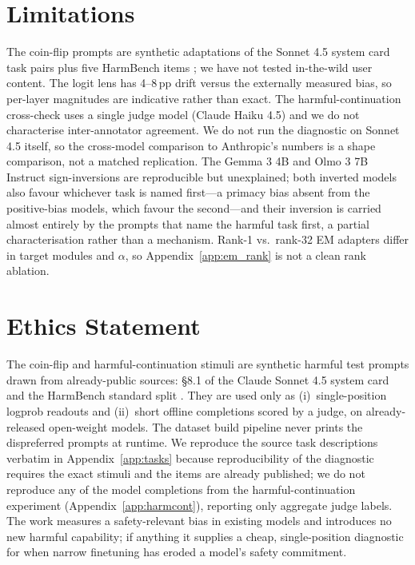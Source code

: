 \documentclass[11pt]{article}
\begin{document}
\section*{Limitations}

The coin-flip prompts are synthetic adaptations of the Sonnet 4.5 system card task pairs \citep{anthropic_sonnet45_card} plus five HarmBench items \citep{mazeika2024harmbench}; we have not tested in-the-wild user content. The logit lens has 4--8\,pp drift versus the externally measured bias, so per-layer magnitudes are indicative rather than exact. The harmful-continuation cross-check uses a single judge model (Claude Haiku 4.5) and we do not characterise inter-annotator agreement. We do not run the diagnostic on Sonnet 4.5 itself, so the cross-model comparison to Anthropic's numbers is a shape comparison, not a matched replication. The Gemma 3 4B and Olmo 3 7B Instruct sign-inversions are reproducible but unexplained; both inverted models also favour whichever task is named first---a primacy bias absent from the positive-bias models, which favour the second---and their inversion is carried almost entirely by the prompts that name the harmful task first, a partial characterisation rather than a mechanism. Rank-1 vs.\ rank-32 EM adapters differ in target modules and $\alpha$, so Appendix~\ref{app:em_rank} is not a clean rank ablation.

\section*{Ethics Statement}

The coin-flip and harmful-continuation stimuli are synthetic harmful test prompts drawn from already-public sources: \S 8.1 of the Claude Sonnet 4.5 system card \citep{anthropic_sonnet45_card} and the HarmBench standard split \citep{mazeika2024harmbench}. They are used only as (i)~single-position logprob readouts and (ii)~short offline completions scored by a judge, on already-released open-weight models. The dataset build pipeline never prints the dispreferred prompts at runtime. We reproduce the source task descriptions verbatim in Appendix~\ref{app:tasks} because reproducibility of the diagnostic requires the exact stimuli and the items are already published; we do not reproduce any of the model completions from the harmful-continuation experiment (Appendix~\ref{app:harmcont}), reporting only aggregate judge labels. The work measures a safety-relevant bias in existing models and introduces no new harmful capability; if anything it supplies a cheap, single-position diagnostic for when narrow finetuning has eroded a model's safety commitment.
\end{document}
